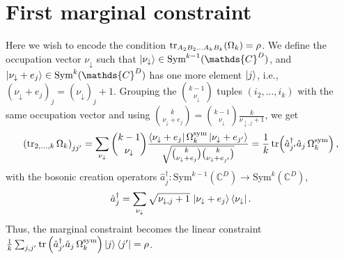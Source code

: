 \documentclass[11pt,a4paper]{report}
\newcommand{\C}{\mathds{C}}
\begin{document}
\section{First marginal constraint}
Here we wish to encode the condition $\tr_{A_2B_2\dots A_kB_k}(\Omega_k) = \rho$.
We define the occupation vector $\nu_\downarrow$ such that $\ket{\nu_\downarrow} \in \text{Sym}^{k-1}(\C^D)$, and $\ket{\nu_\downarrow + e_j} \in \text{Sym}^k(\C^D)$ has one more element $\ket{j}$, i.e., $(\nu_\downarrow + e_j)_j=(\nu_\downarrow)_j + 1$. Grouping the $\binom{k-1}{\nu_\downarrow}$ tuples $(i_2,\dots,i_k)$ with the same occupation vector and using $\binom{k}{\nu_\downarrow+e_j}=\binom{k-1}{\nu_\downarrow}\frac{k}{\nu_{\downarrow,j}+1}$, we get
\begin{equation}
    \left(\tr_{2,\dots,k}\Omega_k\right)_{jj'}
    =\sum_{\nu_\downarrow}\binom{k-1}{\nu_\downarrow}\frac{\bra{\nu_\downarrow+e_j}\Omega_k^{\rm sym}\ket{\nu_\downarrow+e_{j'}}}{\sqrt{\binom{k}{\nu_\downarrow+e_j}\binom{k}{\nu_\downarrow+e_{j'}}}}
    =\frac1k\tr\!\left(\hat a_{j'}^\dagger\hat a_j\,\Omega_k^{\rm sym}\right),
\end{equation}
with the bosonic creation operators $\hat a_j^\dagger:\text{Sym}^{k-1}(\C^D)\to\text{Sym}^k(\C^D)$,
\begin{equation}
    \hat a_j^\dagger=\sum_{\nu_\downarrow}\sqrt{\nu_{\downarrow,j}+1}\,\ket{\nu_\downarrow+e_j}\bra{\nu_\downarrow}.
\end{equation}
Thus, the marginal constraint becomes the linear constraint $\frac1k\sum_{j,j'}\tr\left(\hat a_{j'}^\dagger\hat a_j\,\Omega_k^{\rm sym}\right)\ket{j}\bra{j'}=\rho$.
\end{document}
